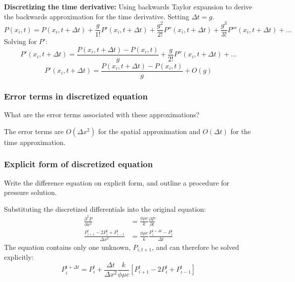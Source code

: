 \textbf{Discretizing the time derivative:}
Using backwards Taylor expansion to derive the backwards approximation for the time derivative. Setting $\Delta t = g$.
\begin{equation}
  P(x_{i},t)=P(x_{i},t+\Delta t)+\frac{g}{1!}P'(x_{i},t+\Delta t)+\frac{g^{2}}{2!}P''(x_{i},t+\Delta t)+\frac{g^{3}}{3!}P'''(x_{i},t+\Delta t)+\dots \nonumber
\end{equation}
Solving for $P'$:
\begin{equation}
  P'(x_{i},t+\Delta t)=\frac{P(x_{i},t+\Delta t)-P(x_{i},t)}{g}+\frac{g}{2!}P''(x_{i},t+\Delta t)+\dots \nonumber
\end{equation}
\begin{equation}
  P'(x_{i},t+\Delta t)=\frac{P(x_{i},t+\Delta t)-P(x_{i},t)}{g}+O\left(g\right)
\end{equation}

\subsubsection{Error terms in discretized equation} %
\label{ssub:error_terms_in_discretized_equation}
\begin{question}
  What are the error terms associated with these approximations?
\end{question}

The error terms are $O(\Delta x^2)$ for the spatial approximation and $O(\Delta t)$ for the time approximation.

\subsubsection{Explicit form of discretized equation} %
\label{ssub:explicit_form_of_discretized_equation}

\begin{question}
  Write the difference equation on explicit form, and outline a procedure for pressure solution.
\end{question}

Substituting the discretized differentials into the original equation:
\begin{align}
  \nonumber
  \frac{\partial^{2}P}{\partial x^{2}} &= \frac{\phi \mu c}{k}\frac{\partial P}{\partial t} \\
  \nonumber
  \frac{P_{i+1}^{t}-2P_{i}^{t}+P_{i-1}^{t}}{\Delta x^{2}}
  &=\frac{\phi\mu c}{k}\frac{P_{i}^{t+\Delta t}-P_{i}^{t}}{\Delta t}
\end{align}
The equation contains only one unknown, $P_{i,t+1}$, and can therefore be solved explicitly:
\begin{equation}
  P_{i}^{t+\Delta t}=P_{i}^{t}+\frac{\Delta t}{\Delta x^{2}}\frac{k}{\phi\mu c}\left[P_{i+1}^{t}-2P_{i}^{t}+P_{i-1}^{t}\right]
\end{equation}

